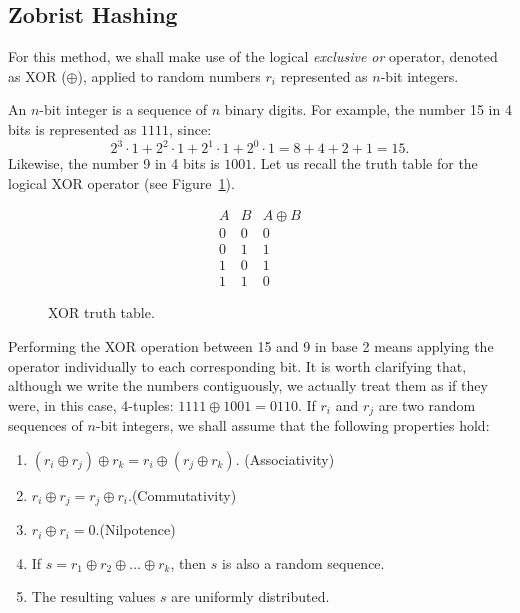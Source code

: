 \subsection{Zobrist Hashing}\label{ZobristHash}

For this method, we shall make use of the logical \textit{exclusive or} operator, denoted as XOR (\(\oplus\)), applied to random numbers \(r_i\) represented as \(n\)-bit integers.

An \(n\)-bit integer is a sequence of \(n\) binary digits. For example, the number 15 in 4 bits is represented as $1111$, since:
\[ 2^3 \cdot 1 + 2^2 \cdot 1 + 2^1 \cdot 1 + 2^0 \cdot 1 = 8 + 4 + 2 + 1 = 15. \]
Likewise, the number 9 in 4 bits is $1001$. Let us recall the truth table for the logical XOR operator (see Figure~\ref{TablaXOR}).
\vspace{10pt}

\begin{figure}
	\vspace{-20pt}
	\centering
	\[
	\begin{array}{c|c|c}
		A & B & A \oplus B \\
		\hline
		0 & 0 & 0 \\
		0 & 1 & 1 \\
		1 & 0 & 1 \\
		1 & 1 & 0
	\end{array}
	\]
	\caption{XOR truth table.}
	\label{TablaXOR}
\end{figure}Performing the XOR operation between 15 and 9 in base 2 means applying the operator individually to each corresponding bit. It is worth clarifying that, although we write the numbers contiguously, we actually treat them as if they were, in this case, 4-tuples: \(1111 \oplus 1001 = 0110\). If \(r_i\) and \(r_j\) are two random sequences of \(n\)-bit integers, we shall assume that the following properties hold:\hfill\break

\begin{enumerate}
	\item[P1)] \(( r_i \oplus r_j ) \oplus r_k = r_i \oplus ( r_j \oplus r_k )\). \hfill(Associativity)
	\item[P2)] \(r_i \oplus r_j = r_j \oplus r_i\).\hfill (Commutativity)
	\item[P3)] \(r_i \oplus r_i = 0\).\hfill (Nilpotence)
	\item[P4)] If \(s = r_1 \oplus r_2 \oplus \dots \oplus r_k\), then \(s\) is also a random sequence.
	\item[P5)] The resulting values \(s\) are uniformly distributed.
\end{enumerate}

